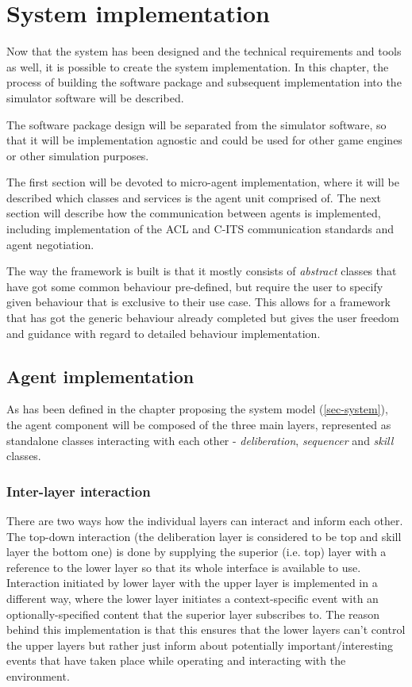 \documentclass[main.tex]{subfiles}
\begin{document}
\section{System implementation}

Now that the system has been designed and the technical requirements and tools as well, it is possible 
to create the system implementation. In this chapter, the process of building the software package 
and subsequent implementation into the simulator software will be described. 

The software package design will be separated from the simulator software, so that it will be 
implementation agnostic and could be used for other game engines or other simulation purposes. 

The first section will be devoted to micro-agent implementation, where it will be described which 
classes and services is the agent unit comprised of. The next section will describe how the 
communication between agents is implemented, including implementation of the ACL and C-ITS communication 
standards and agent negotiation. 

The way the framework is built is that it mostly consists of \emph{abstract} classes that have got some 
common behaviour pre-defined, but require the user to specify given behaviour that is exclusive to their 
use case. This allows for a framework that has got the generic behaviour already completed but 
gives the user freedom and guidance with regard to detailed behaviour implementation. 

\subsection{Agent implementation}

As has been defined in the chapter proposing the system model (\ref{sec-system}), the agent component 
will be composed of the three main layers, represented as standalone classes interacting with 
each other - \emph{deliberation}, \emph{sequencer} and \emph{skill} classes.

\subsubsection{Inter-layer interaction}

There are two ways how the individual layers can interact and inform each other. The top-down 
interaction (the deliberation layer is considered to be top and skill layer the bottom one) 
is done by supplying the superior (i.e. top) layer with a reference to the lower layer so that 
its whole interface is available to use. Interaction initiated by lower layer with the upper layer 
is implemented in a different way, where the lower layer initiates a context-specific event with an 
optionally-specified content that the superior layer subscribes to. The reason behind this implementation
is that this ensures that the lower layers can't control the upper layers but rather just inform about 
potentially important/interesting events that have taken place while operating and interacting with 
the environment.
\end{document}
